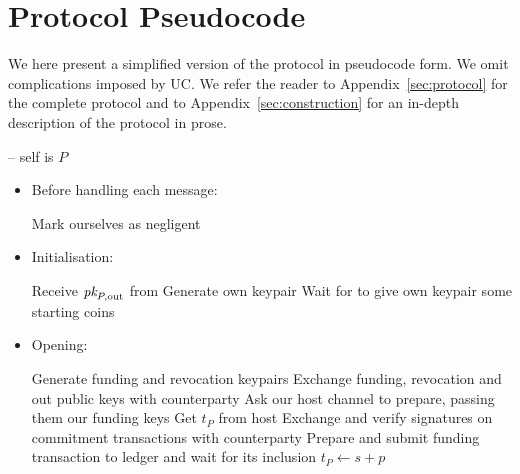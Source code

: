 \section{Protocol Pseudocode}
\label{sec:pseudocode}

We here present a simplified version of the protocol in pseudocode form. We omit
complications imposed by UC. We refer the reader to Appendix~\ref{sec:protocol}
for the complete protocol and to Appendix~\ref{sec:construction} for an in-depth
description of the protocol in prose.
\ \\

\begin{center}
  \begin{processbox}{\pchan -- self is $P$}
    \begin{itemize}
      \item Before handling each message:
      \begin{algorithmic}[0]
          \State Mark ourselves as negligent 
        \EndIf
      \end{algorithmic}

      \item Initialisation:
      \begin{algorithmic}[0]
        \State Receive $\textit{pk}_{P, \mathrm{out}}$ from \environment{} 
        \State Generate own keypair
        \State Wait for \environment to give own keypair some starting coins
      \end{algorithmic}

      \item Opening:
      \begin{algorithmic}[0]
        \State Generate funding and revocation keypairs
        \State Exchange funding, revocation and out public keys with
        counterparty
          \State Ask our host channel to prepare, passing them our funding keys
          \State Get $t_P$ from host 
        \EndIf
        \State Exchange and verify signatures on commitment transactions with
        counterparty
          \State Prepare and submit funding transaction to ledger and wait for
          its inclusion 
          \State $t_P \gets s + p$ 
        \EndIf
      \end{algorithmic}


\end{itemize}
\end{processbox}
\end{center}
